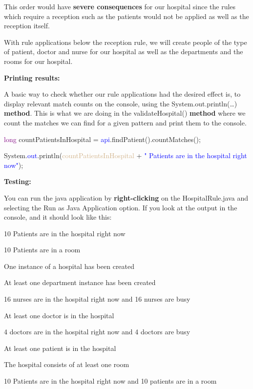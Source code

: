This order would have \textbf{severe consequences} for our hospital since the rules which require a reception such as the patients would not be applied as well as the reception itself. \newline

With rule applications below the reception rule, we will create people of the type of patient, doctor and nurse for our hospital as well as the departments and the rooms for our hospital.\newline

\textbf{Printing results:}

A basic way to check whether our rule applications had the desired effect is, to display relevant match counts on the console, using the \textsf{System.out.println(…)} \textbf{method}. This is what we are doing in the \textsf{validateHospital()} \textbf{method} where we count the matches we can find for a given pattern and print them to the console.\newline

{

\textcolor{Purple}{long} countPatientsInHospital = \textcolor{blue}{api}.findPatient().countMatches();

System.\textcolor{blue}{out}.println(\textcolor{Tan}{countPatientsInHospital} + \textcolor{blue}{" Patients are in the hospital right now"});\newline\newline

}

\clearpage

\textbf{Testing:}

You can run the java application by \textbf{right-clicking} on the \textsf{HospitalRule.java} and selecting the \textsf{Run as Java Application} option. If you look at the output in the console, and it should look like this:\newline

{

\textsf{10 Patients are in the hospital right now}

\textsf{10 Patients are in a room}

\textsf{One instance of a hospital has been created}

\textsf{At least one department instance has been created}

\textsf{16 nurses are in the hospital right now and 16 nurses are busy}

\textsf{At least one doctor is in the hospital}

\textsf{4 doctors are in the hospital right now and 4 doctors are busy}

\textsf{At least one patient is in the hospital}

\textsf{The hospital consists of at least one room}

\textsf{10 Patients are in the hospital right now and 10 patients are in a room}\newline

}

